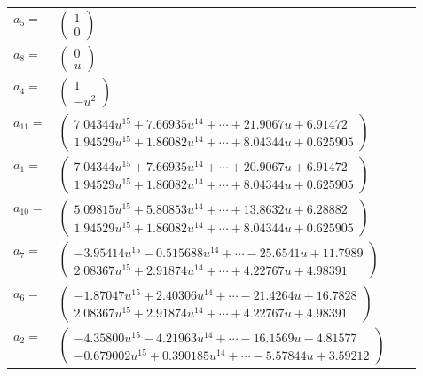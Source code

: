 \documentclass[1p]{elsarticle_modified}
\theoremstyle{definition}
\begin{document}
\begin{tabular}{m{7pt} m{180pt} m{7pt} m{180pt} }
\flushright $a_{5}=$&$\begin{pmatrix}1\\0\end{pmatrix}$ \\
\flushright $a_{8}=$&$\begin{pmatrix}0\\u\end{pmatrix}$ \\
\flushright $a_{4}=$&$\begin{pmatrix}1\\- u^2\end{pmatrix}$ \\
\flushright $a_{11}=$&$\begin{pmatrix}7.04344 u^{15}+7.66935 u^{14}+\cdots+21.9067 u+6.91472\\1.94529 u^{15}+1.86082 u^{14}+\cdots+8.04344 u+0.625905\end{pmatrix}$ \\
\flushright $a_{1}=$&$\begin{pmatrix}7.04344 u^{15}+7.66935 u^{14}+\cdots+20.9067 u+6.91472\\1.94529 u^{15}+1.86082 u^{14}+\cdots+8.04344 u+0.625905\end{pmatrix}$ \\
\flushright $a_{10}=$&$\begin{pmatrix}5.09815 u^{15}+5.80853 u^{14}+\cdots+13.8632 u+6.28882\\1.94529 u^{15}+1.86082 u^{14}+\cdots+8.04344 u+0.625905\end{pmatrix}$ \\
\flushright $a_{7}=$&$\begin{pmatrix}-3.95414 u^{15}-0.515688 u^{14}+\cdots-25.6541 u+11.7989\\2.08367 u^{15}+2.91874 u^{14}+\cdots+4.22767 u+4.98391\end{pmatrix}$ \\
\flushright $a_{6}=$&$\begin{pmatrix}-1.87047 u^{15}+2.40306 u^{14}+\cdots-21.4264 u+16.7828\\2.08367 u^{15}+2.91874 u^{14}+\cdots+4.22767 u+4.98391\end{pmatrix}$ \\
\flushright $a_{2}=$&$\begin{pmatrix}-4.35800 u^{15}-4.21963 u^{14}+\cdots-16.1569 u-4.81577\\-0.679002 u^{15}+0.390185 u^{14}+\cdots-5.57844 u+3.59212\end{pmatrix}$ \\

\end{tabular}
\end{document}
